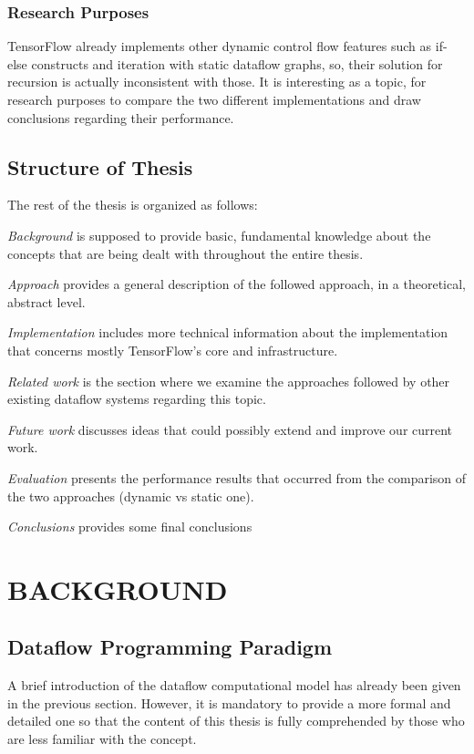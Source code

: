 \documentclass[ack,preface]{dithesis}
\begin{document}
    \subsection{Research Purposes}
	TensorFlow already implements other dynamic control flow features such as if-else constructs and iteration with static dataflow graphs, so, their solution for recursion is actually inconsistent with those. It is interesting as a topic, for research purposes to compare the two different implementations and draw conclusions regarding their performance. 

    \section{Structure of Thesis}
The rest of the thesis is organized as follows:

\textit{Background} is supposed to provide basic, fundamental knowledge about the concepts that are being dealt with throughout the entire thesis.

\textit{Approach} provides a general description of the followed approach, in a theoretical, abstract level.

\textit{Implementation} includes more technical information about the implementation that concerns mostly TensorFlow's core and infrastructure.

\textit{Related work} is the section where we examine the approaches followed by other existing dataflow systems regarding this topic.

\textit{Future work} discusses ideas that could possibly extend and improve our current work.

\textit{Evaluation} presents the performance results that occurred from the comparison of the two approaches (dynamic vs static one).

\textit{Conclusions} provides some final conclusions


\chapter{BACKGROUND}
    \section{Dataflow Programming Paradigm}
A brief introduction of the dataflow computational model has already been given in the previous section. However, it is mandatory to provide a more formal and detailed one so that the content of this thesis is fully comprehended by those who are less familiar with the concept.
\end{document}
